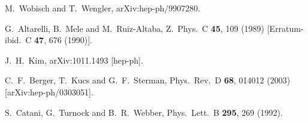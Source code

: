 \documentclass{JHEP3}
\begin{document}
\begin{thebibliography}{99}
  M.~Wobisch and T.~Wengler,
  arXiv:hep-ph/9907280.


  G.~Altarelli, B.~Mele and M.~Ruiz-Altaba,
  Z.\ Phys.\  C {\bf 45}, 109 (1989)
  [Erratum-ibid.\  C {\bf 47}, 676 (1990)].

  J.~H.~Kim,
  arXiv:1011.1493 [hep-ph].

  C.~F.~Berger, T.~Kucs and G.~F.~Sterman,
  Phys.\ Rev.\  D {\bf 68}, 014012 (2003)
  [arXiv:hep-ph/0303051].

  S.~Catani, G.~Turnock and B.~R.~Webber,
  Phys.\ Lett.\  B {\bf 295}, 269 (1992).


\end{thebibliography}
\end{document}
